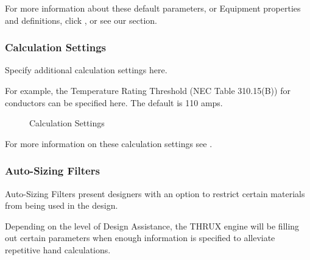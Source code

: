 \documentclass[letterpaper,10pt,english]{sphinxmanual}
\begin{document}
For more information about these default parameters, or Equipment properties and definitions, click {\hyperref[\detokenize{docs/definitions/index-definitions:default-model-parameters-definitions}]{}}, or see our {\hyperref[\detokenize{docs/definitions/index-definitions:definitions}]{}} section.


\subsubsection{Calculation Settings}
\label{\detokenize{docs/userguide/projectsettings/calculationsettings/index-calculation_settings:calculation-settings}}\label{\detokenize{docs/userguide/projectsettings/calculationsettings/index-calculation_settings:id1}}\label{\detokenize{docs/userguide/projectsettings/calculationsettings/index-calculation_settings::doc}}
Specify additional calculation settings here.

For example, the Temperature Rating Threshold (NEC Table 310.15(B)) for conductors can be specified here.  The default is 110 amps.

\begin{figure}[H]
\centering
\capstart

\noindent{}
\caption{Calculation Settings}\label{\detokenize{docs/userguide/projectsettings/calculationsettings/index-calculation_settings:id2}}\end{figure}

For more information on these calculation settings see {\hyperref[\detokenize{docs/definitions/index-definitions:calculation-settings-definitions}]{}}.


\subsubsection{Auto-Sizing Filters}
\label{\detokenize{docs/userguide/projectsettings/autosizingfilters/index-auto_sizing_filters:auto-sizing-filters}}\label{\detokenize{docs/userguide/projectsettings/autosizingfilters/index-auto_sizing_filters:id1}}\label{\detokenize{docs/userguide/projectsettings/autosizingfilters/index-auto_sizing_filters::doc}}
Auto-Sizing Filters present designers with an option to restrict certain materials from being used in the design.

Depending on the level of Design Assistance, the THRUX engine will be filling out certain parameters when enough information is specified to alleviate repetitive hand calculations.
\end{document}
